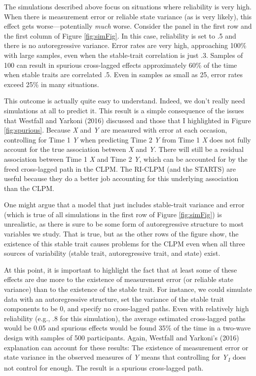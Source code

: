\documentclass[
  english,
  man,floatsintext]{apa6}
\begin{document}
The simulations described above focus on situations where reliability is very high. When there is measurement error or reliable state variance (as is very likely), this effect gets worse---potentially \emph{much} worse. Consider the panel in the first row and the first column of Figure \ref{fig:simFig}. In this case, reliability is set to .5 and there is no autoregressive variance. Error rates are very high, approaching 100\% with large samples, even when the stable-trait correlation is just .3. Samples of 100 can result in spurious cross-lagged effects approximately 60\% of the time when stable traits are correlated .5. Even in samples as small as 25, error rates exceed 25\% in many situations.

This outcome is actually quite easy to understand. Indeed, we don't really need simulations at all to predict it. This result is a simple consequence of the issues that Westfall and Yarkoni (2016) discussed and those that I highlighted in Figure \ref{fig:spurious}. Because \emph{X} and \emph{Y} are measured with error at each occasion, controlling for Time 1 \emph{Y} when predicting Time 2 \emph{Y} from Time 1 \emph{X} does not fully account for the true association between \emph{X} and \emph{Y}. There will still be a residual association between Time 1 \emph{X} and Time 2 \emph{Y}, which can be accounted for by the freed cross-lagged path in the CLPM. The RI-CLPM (and the STARTS) are useful because they do a better job accounting for this underlying association than the CLPM.

One might argue that a model that just includes stable-trait variance and error (which is true of all simulations in the first row of Figure \ref{fig:simFig}) is unrealistic, as there is sure to be some form of autoregressive structure to most variables we study. That is true, but as the other rows of the figure show, the existence of this stable trait causes problems for the CLPM even when all three sources of variability (stable trait, autoregressive trait, and state) exist.

At this point, it is important to highlight the fact that at least some of these effects are due more to the existence of measurement error (or reliable state variance) than to the existence of the stable trait. For instance, we could simulate data with an autoregressive structure, set the variance of the stable trait components to be 0, and specify no cross-lagged paths. Even with relatively high reliability (e.g., .8 for this simulation), the average estimated cross-lagged paths would be 0.05 and spurious effects would be found 35\% of the time in a two-wave design with samples of 500 participants. Again, Westfall and Yarkoni's (2016) explanation can account for these results: The existence of measurement error or state variance in the observed measures of \emph{Y} means that controlling for \emph{Y\textsubscript{1}} does not control for enough. The result is a spurious cross-lagged path.
\end{document}
